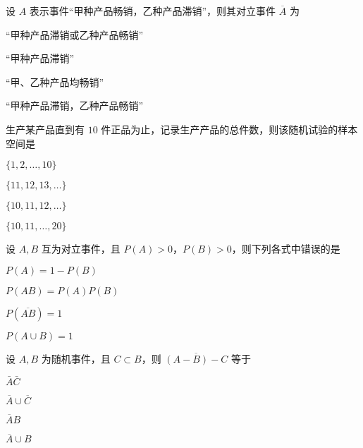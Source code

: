 \documentclass{exam-zh}
\begin{document}
\begin{question}
  设 $A$ 表示事件“甲种产品畅销，乙种产品滞销”，则其对立事件 $\overline{A}$ 为 \paren[A]
  \begin{choices}
    \item “甲种产品滞销或乙种产品畅销”  
    \item “甲种产品滞销”  
    \item “甲、乙种产品均畅销”  
    \item “甲种产品滞销，乙种产品畅销”  
  \end{choices}
\end{question}

\begin{question}
  生产某产品直到有 $10$ 件正品为止，记录生产产品的总件数，则该随机试验的样本空间是 \paren[C]
  \begin{choices}
    \item $\{1,2,\dots,10\}$  
    \item $\{11,12,13,\dots\}$  
    \item $\{10,11,12,\dots\}$  
    \item $\{10,11,\dots,20\}$  
  \end{choices}
\end{question}

\begin{question}
  设 $A, B$ 互为对立事件，且 $P(A) > 0$，$P(B) > 0$，则下列各式中错误的是 \paren[B]
  \begin{choices}
    \item $P(A) = 1 - P(B)$  
    \item $P(AB) = P(A)P(B)$  
    \item $P(\overline{AB}) = 1$  
    \item $P(A \cup B) = 1$  
  \end{choices}
\end{question}

\begin{question}
  设 $A, B$ 为随机事件，且 $C \subset B$，则 $\overline{(A-B)-C}$ 等于 \paren[D]
  \begin{choices}
    \item $\bar{A} \bar{C}$   
    \item $\overline{A} \cup \overline{C}$  
    \item $\overline{A} B$  
    \item $\overline{A} \cup B$  
  \end{choices}
\end{question}
\end{document}
